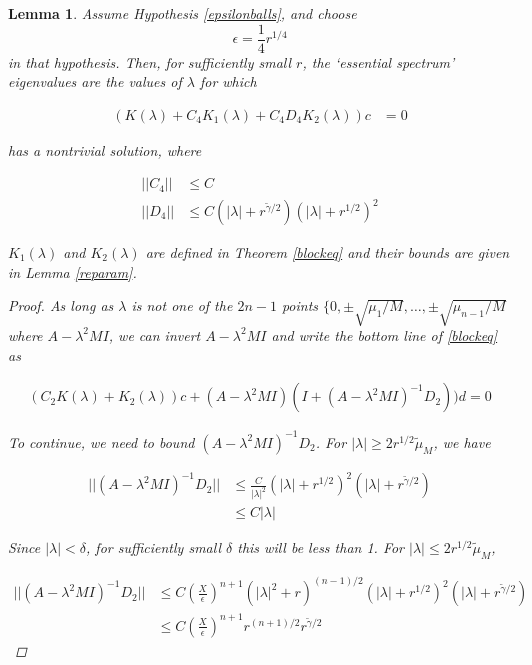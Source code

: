 \documentclass[12pt]{article}
\newtheorem{lemma}{Lemma}
\begin{document}
\begin{lemma}\label{ceqlemma}
Assume Hypothesis \ref{epsilonballs}, and choose 
\begin{equation}\label{epsilon2}
\epsilon = \frac{1}{4}r^{1/4}
\end{equation}
in that hypothesis. Then, for sufficiently small $r$, the `essential spectrum' eigenvalues are the values of $\lambda$ for which 

\begin{align}\label{eqforc}
(K(\lambda) + C_4 K_1(\lambda) + C_4 D_4 K_2(\lambda))c &= 0
\end{align}

has a nontrivial solution, where

\begin{align*}
||C_4|| &\leq C \\
||D_4|| &\leq C(|\lambda| + r^{\tilde{\gamma}/2})(|\lambda| + r^{1/2})^2
\end{align*}

$K_1(\lambda)$ and $K_2(\lambda)$ are defined in Theorem \ref{blockeq} and their bounds are given in Lemma \ref{reparam}.

\begin{proof}
As long as $\lambda$ is not one of the $2n - 1$ points $\{0, \pm \sqrt{\mu_1/M}, \dots, \pm \sqrt{\mu_{n-1}/M}$ where $A - \lambda^2 MI$, we can invert $A - \lambda^2 MI$ and write the bottom line of \eqref{blockeq} as 

\begin{align}\label{blockeqbottom}
(C_2 K(\lambda) + K_2(\lambda))c 
+ (A - \lambda^2 MI)(I + (A - \lambda^2 MI)^{-1} D_2))d = 0
\end{align}

To continue, we need to bound $(A - \lambda^2 MI)^{-1} D_2$. For $|\lambda| \geq 2 r^{1/2} \tilde{\mu}_M$, we have

\begin{align*}
|| (A - \lambda^2 MI)^{-1} D_2 || &\leq \frac{C}{|\lambda|^2} (|\lambda| + r^{1/2})^2 (|\lambda| + r^{\tilde{\gamma}/2}) \\ 
&\leq C |\lambda|
\end{align*}

Since $|\lambda| < \delta$, for sufficiently small $\delta$ this will be less than 1. For $|\lambda| \leq 2 r^{1/2} \tilde{\mu}_M$,

\begin{align*}
|| (A - \lambda^2 MI)^{-1} D_2 || &\leq C \left(\frac{X}{\epsilon}\right)^{n+1}\left( |\lambda|^2 + r \right)^{(n-1)/2} (|\lambda| + r^{1/2})^2 (|\lambda| + r^{\tilde{\gamma}/2}) \\
&\leq C \left(\frac{X}{\epsilon}\right)^{n+1} r^{(n+1)/2} r^{\tilde{\gamma}/2}
\end{align*}


\end{proof}
\end{lemma}
\end{document}
